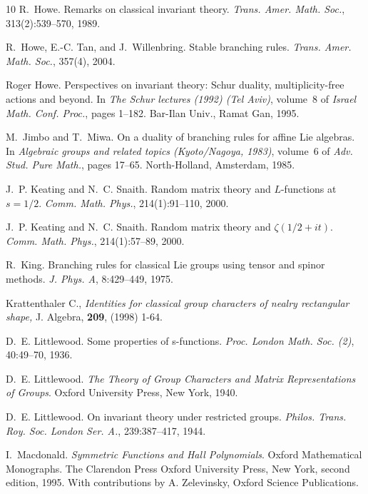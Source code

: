 \documentclass[11pt]{amsart}
\begin{document}
\begin{thebibliography}{10}
R.~Howe. {\newblock}Remarks on classical
invariant theory. {\newblock} \textit{Trans. Amer. Math. Soc.},
313(2):539--570, 1989.

R.~Howe, E.-C. Tan, and J.~Willenbring.
{\newblock}Stable branching rules. {\newblock} \textit{Trans.
Amer. Math. Soc.}, 357(4), 2004.

Roger Howe. {\newblock}Perspectives on
invariant theory: Schur duality, multiplicity-free actions and
beyond. {\newblock}In \textit{The Schur lectures (1992) (Tel
Aviv)}, volume~8 of \textit{Israel Math. Conf. Proc.}, pages
1--182. Bar-Ilan Univ., Ramat Gan, 1995.

M.~Jimbo and T.~Miwa. {\newblock}On a duality of branching
rules for affine Lie algebras. {\newblock}In \textit{Algebraic
groups and related topics (Kyoto/Nagoya, 1983)}, volume~6 of
\textit{Adv. Stud. Pure Math.}, pages 17--65. North-Holland,
Amsterdam, 1985.

J.~P. Keating and N.~C. Snaith. {\newblock}Random matrix
theory and $L$-functions at $s = 1 / 2$. {\newblock} \textit{Comm.
Math. Phys.}, 214(1):91--110, 2000.

J.~P. Keating and N.~C. Snaith. {\newblock}Random matrix
theory and $\zeta ( 1 / 2 + it )$. {\newblock} \textit{Comm. Math.
Phys.}, 214(1):57--89, 2000.

R.~King. {\newblock}Branching rules for classical
Lie groups using tensor and spinor methods. {\newblock} \textit{J.
Phys. A}, 8:429--449, 1975.

Krattenthaler C., \emph{Identities for classical group characters
of nealry rectangular shape,} J. Algebra, \textbf{209}, (1998)
1-64.

D.~E. Littlewood. {\newblock}Some properties of
s-functions. {\newblock} \textit{Proc. London Math. Soc. (2)},
40:49--70, 1936.

D.~E. Littlewood. {\newblock} \textit{The Theory of Group
Characters and Matrix Representations of Groups}.
{\newblock}Oxford University Press, New York, 1940.

D.~E. Littlewood. {\newblock}On invariant theory under
restricted groups. {\newblock} \textit{Philos. Trans. Roy. Soc.
London Ser. A.}, 239:387--417, 1944.

I.~Macdonald. {\newblock} \textit{Symmetric Functions and
Hall Polynomials}. {\newblock}Oxford Mathematical Monographs. The
Clarendon Press Oxford University Press, New York, second edition,
1995. {\newblock}With contributions by A. Zelevinsky, Oxford
Science Publications.


\end{thebibliography}
\end{document}
